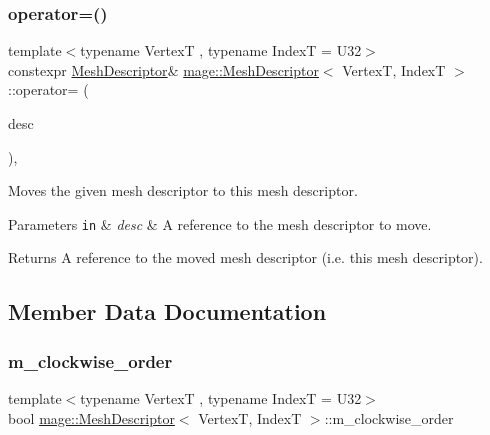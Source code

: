 \subsubsection{\texorpdfstring{operator=()}{operator=()}\hspace{0.1cm}{\footnotesize\ttfamily [2/2]}}
{\footnotesize\ttfamily template$<$typename VertexT , typename IndexT  = U32$>$ \\
constexpr \hyperlink{classmage_1_1_mesh_descriptor}{Mesh\+Descriptor}\& \hyperlink{classmage_1_1_mesh_descriptor}{mage\+::\+Mesh\+Descriptor}$<$ VertexT, IndexT $>$\+::operator= (\begin{DoxyParamCaption}\item[{\hyperlink{classmage_1_1_mesh_descriptor}{Mesh\+Descriptor}$<$ VertexT, IndexT $>$ \&\&}]{desc }\end{DoxyParamCaption})\hspace{0.3cm}{\ttfamily [default]}, {\ttfamily [noexcept]}}

Moves the given mesh descriptor to this mesh descriptor.


\begin{DoxyParams}[1]{Parameters}
\mbox{\tt in}  & {\em desc} & A reference to the mesh descriptor to move. \\
\hline
\end{DoxyParams}
\begin{DoxyReturn}{Returns}
A reference to the moved mesh descriptor (i.\+e. this mesh descriptor). 
\end{DoxyReturn}


\subsection{Member Data Documentation}
\hypertarget{classmage_1_1_mesh_descriptor_aa64fd6421b27729a6b27ad0c2b70af1e}{}\label{classmage_1_1_mesh_descriptor_aa64fd6421b27729a6b27ad0c2b70af1e} 
\subsubsection{\texorpdfstring{m\+\_\+clockwise\+\_\+order}{m\_clockwise\_order}}
{\footnotesize\ttfamily template$<$typename VertexT , typename IndexT  = U32$>$ \\
bool \hyperlink{classmage_1_1_mesh_descriptor}{mage\+::\+Mesh\+Descriptor}$<$ VertexT, IndexT $>$\+::m\+\_\+clockwise\+\_\+order\hspace{0.3cm}{\ttfamily [private]}}

